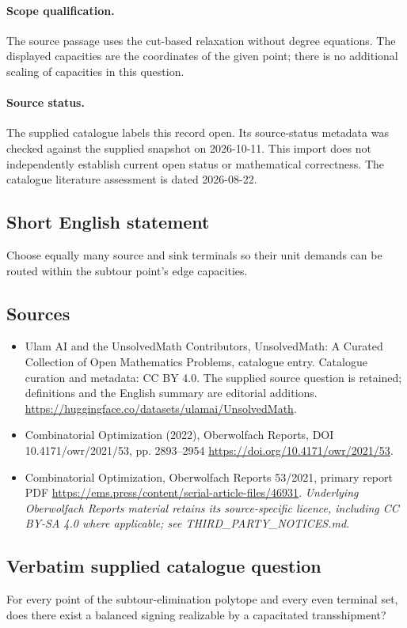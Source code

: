 \documentclass[11pt]{article}
\begin{document}
\paragraph{Scope qualification.}
The source passage uses the cut-based relaxation without degree equations. The displayed capacities are the coordinates of the given point; there is no additional scaling of capacities in this question.
\paragraph{Source status.}
The supplied catalogue labels this record open. Its source-status metadata was checked against the supplied snapshot on 2026-10-11. This import does not independently establish current open status or mathematical correctness. The catalogue literature assessment is dated 2026-08-22.
\subsection{Short English statement}
Choose equally many source and sink terminals so their unit demands can be routed within the subtour point's edge capacities.
\subsection{Sources}
\begin{itemize}
\item[S1] Ulam AI and the UnsolvedMath Contributors, UnsolvedMath: A Curated Collection of Open Mathematics Problems, catalogue entry. Catalogue curation and metadata: CC BY 4.0. The supplied source question is retained; definitions and the English summary are editorial additions.
\url{https://huggingface.co/datasets/ulamai/UnsolvedMath}.
\item[S2] Combinatorial Optimization (2022), Oberwolfach Reports, DOI 10.4171/owr/2021/53, pp. 2893--2954
\url{https://doi.org/10.4171/owr/2021/53}.
\item[S3] Combinatorial Optimization, Oberwolfach Reports 53/2021, primary report PDF
\url{https://ems.press/content/serial-article-files/46931}.
\textit{Underlying Oberwolfach Reports material retains its source-specific licence, including CC BY-SA 4.0 where applicable; see THIRD\_PARTY\_NOTICES.md.}
\end{itemize}
\subsection{Verbatim supplied catalogue question}
For every point of the subtour-elimination polytope and every even terminal set, does there exist a balanced signing realizable by a capacitated transshipment?
\end{document}
